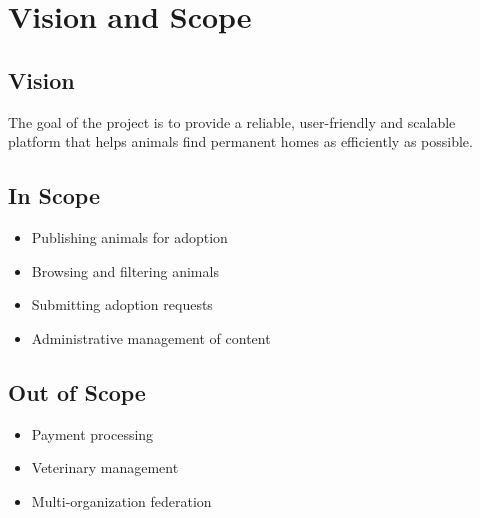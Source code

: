 \section{Vision and Scope}

\subsection{Vision}
The goal of the project is to provide a reliable, user-friendly and scalable platform
that helps animals find permanent homes as efficiently as possible.

\subsection{In Scope}
\begin{itemize}
  \item Publishing animals for adoption
  \item Browsing and filtering animals
  \item Submitting adoption requests
  \item Administrative management of content
\end{itemize}

\subsection{Out of Scope}
\begin{itemize}
  \item Payment processing
  \item Veterinary management
  \item Multi-organization federation
\end{itemize}

